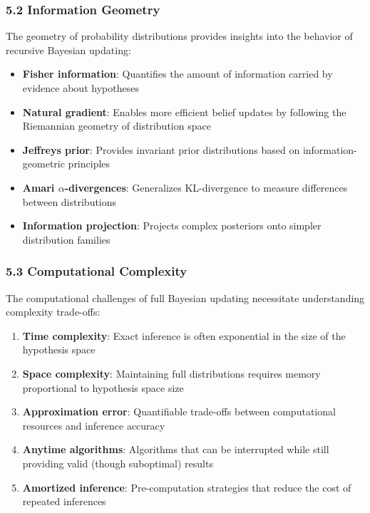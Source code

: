 \documentclass[
]{article}
\providecommand{\tightlist}{%
  \setlength{\itemsep}{0pt}\setlength{\parskip}{0pt}}
\begin{document}
\subsubsection{5.2 Information Geometry}\label{information-geometry}

The geometry of probability distributions provides insights into the
behavior of recursive Bayesian updating:

\begin{itemize}
\tightlist
\item
  \textbf{Fisher information}: Quantifies the amount of information
  carried by evidence about hypotheses
\item
  \textbf{Natural gradient}: Enables more efficient belief updates by
  following the Riemannian geometry of distribution space
\item
  \textbf{Jeffreys prior}: Provides invariant prior distributions based
  on information-geometric principles
\item
  \textbf{Amari \(\alpha \)-divergences}: Generalizes KL-divergence to
  measure differences between distributions
\item
  \textbf{Information projection}: Projects complex posteriors onto
  simpler distribution families
\end{itemize}

\subsubsection{5.3 Computational
Complexity}\label{computational-complexity}

The computational challenges of full Bayesian updating necessitate
understanding complexity trade-offs:

\begin{enumerate}
\def\labelenumi{\arabic{enumi}.}
\tightlist
\item
  \textbf{Time complexity}: Exact inference is often exponential in the
  size of the hypothesis space
\item
  \textbf{Space complexity}: Maintaining full distributions requires
  memory proportional to hypothesis space size
\item
  \textbf{Approximation error}: Quantifiable trade-offs between
  computational resources and inference accuracy
\item
  \textbf{Anytime algorithms}: Algorithms that can be interrupted while
  still providing valid (though suboptimal) results
\item
  \textbf{Amortized inference}: Pre-computation strategies that reduce
  the cost of repeated inferences
\end{enumerate}
\end{document}
